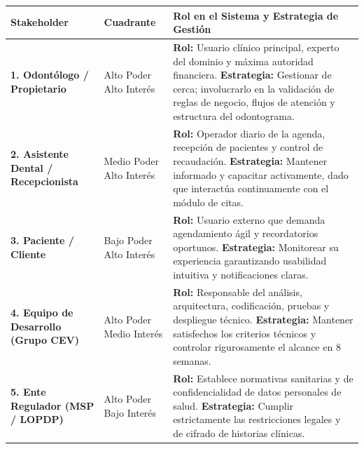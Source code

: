 \documentclass[11pt,a4paper]{article}
\begin{document}
\begin{xltabular}{\textwidth}{|p{0.23\textwidth}|p{0.18\textwidth}|X|}
\hline
{}
\textbf{Stakeholder} & \textbf{Cuadrante} & \textbf{Rol en el Sistema y Estrategia de Gestión} \\ \hline
\endhead

\textbf{1. Odontólogo / Propietario} & Alto Poder \newline Alto Interés & \textbf{Rol:} Usuario clínico principal, experto del dominio y máxima autoridad financiera. \newline \textbf{Estrategia:} Gestionar de cerca; involucrarlo en la validación de reglas de negocio, flujos de atención y estructura del odontograma. \\ \hline

\textbf{2. Asistente Dental / Recepcionista} & Medio Poder \newline Alto Interés & \textbf{Rol:} Operador diario de la agenda, recepción de pacientes y control de recaudación. \newline \textbf{Estrategia:} Mantener informado y capacitar activamente, dado que interactúa continuamente con el módulo de citas. \\ \hline

\textbf{3. Paciente / Cliente} & Bajo Poder \newline Alto Interés & \textbf{Rol:} Usuario externo que demanda agendamiento ágil y recordatorios oportunos. \newline \textbf{Estrategia:} Monitorear su experiencia garantizando usabilidad intuitiva y notificaciones claras. \\ \hline

\textbf{4. Equipo de Desarrollo (Grupo CEV)} & Alto Poder \newline Medio Interés & \textbf{Rol:} Responsable del análisis, arquitectura, codificación, pruebas y despliegue técnico. \newline \textbf{Estrategia:} Mantener satisfechos los criterios técnicos y controlar rigurosamente el alcance en 8 semanas. \\ \hline

\textbf{5. Ente Regulador (MSP / LOPDP)} & Alto Poder \newline Bajo Interés & \textbf{Rol:} Establece normativas sanitarias y de confidencialidad de datos personales de salud. \newline \textbf{Estrategia:} Cumplir estrictamente las restricciones legales y de cifrado de historias clínicas. \\ \hline
\end{xltabular}
\end{document}
